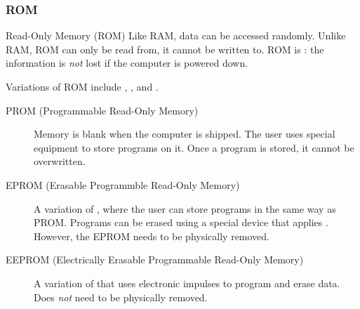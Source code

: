 \documentclass[../notes.tex]{subfiles}
\begin{document}
				\subsubsection{ROM}
					\begin{definition}{Read-Only Memory (ROM)}
						Like RAM, data can be accessed randomly. Unlike RAM, ROM can only be read from, it cannot be written to. ROM is : the information is \emph{not} lost if the computer is powered down.
					\end{definition}
					Variations of ROM include , , and .
					\begin{indentparagraph}
						\begin{description}
							\item[PROM (Programmable Read-Only Memory)] Memory is blank when the computer is shipped. The user uses special equipment to store programs on it. Once a program is stored, it cannot be overwritten.
							\item[EPROM (Erasable Programmble Read-Only Memory)] A variation of , where the user can store programs in the same way as PROM. Programs can be erased using a special device that applies . However, the EPROM needs to be physically removed.
							\item[EEPROM (Electrically Erasable Programmable Read-Only Memory)] A variation of  that uses electronic impulses to program and erase data. Does \emph{not} need to be physically removed. 
						\end{description}
					\end{indentparagraph}
			\pagebreak
\end{document}
